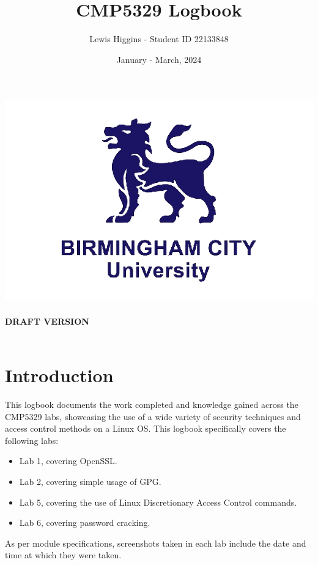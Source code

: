 \documentclass[12pt]{report}
\title{CMP5329 Logbook}
\author{Lewis Higgins - Student ID 22133848}
\date{January - March, 2024}
\begin{document}
    \pagecolor{yellow}

    \makeatletter
    \begin{titlepage}
        \begin{center}
            \includegraphics[width=0.7\linewidth]{bcu logo}\\[4ex]
            {\huge \bfseries  \@title }\\[2ex]
            {\huge \bfseries  DRAFT VERSION }\\[2ex]
            {\@author}\\[50ex]
            {\large \@date}
        \end{center}
    \end{titlepage}
    \makeatother
    \thispagestyle{empty}
    \newpage

    \pagecolor{white}

    \tableofcontents
    \chapter*{Introduction}\label{ch:introduction}

    This logbook documents the work completed and knowledge gained across the CMP5329 labs, showcasing
    the use of a wide variety of security techniques and access control methods on a Linux OS\@.
    This logbook specifically covers the following labs:
    \begin{itemize}
        \item Lab 1, covering OpenSSL\@.
        \item Lab 2, covering simple usage of GPG\@.
        \item Lab 5, covering the use of Linux Discretionary Access Control commands.
        \item Lab 6, covering password cracking.
    \end{itemize}

    As per module specifications, screenshots taken in each lab
    include the date and time at which they were taken.\\
\end{document}
